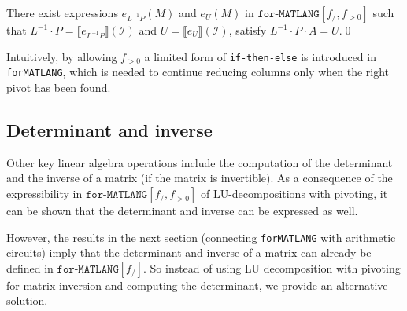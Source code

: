 \documentclass[sigconf]{acmart}
\newcommand{\sem}[2]{\llbracket #1 \rrbracket(#2)}
\newcommand{\I}{\mathcal{I}}
\newcommand{\langfor}{\texttt{for}\text{-}\texttt{MATLANG}\xspace}
\newcommand{\langforf}[1]{\texttt{for}\text{-}\texttt{MATLANG}[#1]\xspace}
\begin{document}
\begin{proposition}\label{prop:palu}
There exist expressions $e_{L^{-1}P}(M)$ and $e_U(M)$ in $\langforf{f_/,f_{>0}}$  such that
$L^{-1}\cdot P=\sem{e_{L^{-1}P}}{\I}$ and $U=\sem{e_U}{\I}$, satisfy $L^{-1}\cdot P\cdot A=U$.\qed
\end{proposition}
Intuitively, by allowing $f_{>0}$ a limited form of \texttt{if-then-else} is introduced in \langfor, which is needed
to continue reducing columns only when the right pivot has been found.


\subsection{Determinant and inverse}
Other key linear algebra operations include the computation of the determinant and
the inverse of a matrix (if the matrix is invertible). As a consequence of the expressibility
in $\langforf{f_/,f_{>0}}$ of LU-decompositions with pivoting, it can be shown that the determinant
and inverse can be expressed as well. 

However, the results
in the next section (connecting \langfor with arithmetic circuits) imply that the determinant
and inverse of a matrix can already be defined in $\langforf{f_/}$. So instead of using LU decomposition with pivoting for matrix inversion and computing the determinant, we provide an alternative solution.
\end{document}
